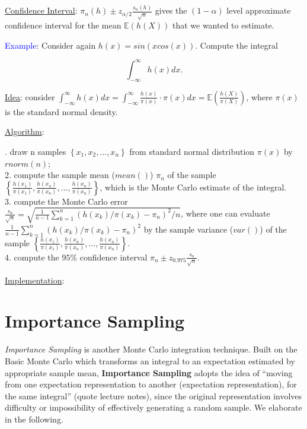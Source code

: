 \documentclass[12pt]{article}
\newcommand{\E}{\mathbb{E}}
\newcommand{\set}[1]{\left\{#1\right\}}
\newcommand{\paren}[1]{\left(#1\right)}
\numberwithin{equation}{subsection}
\begin{document}
\noindent
\underline{Confidence Interval}: $\pi_n(h) \pm z_{\alpha/2}\frac{s_n(h)}{\sqrt{n}}$ gives the $(1-\alpha)$ level approximate confidence interval for the mean $\E\paren{h(X)}$ that we wanted to estimate. \newline

\noindent
\textcolor{blue}{Example}: Consider again $h(x) = sin(xcos(x))$. Compute the integral 

$$ \int_{-\infty}^\infty h(x)dx. $$

\noindent
\underline{Idea}:
consider $\int_{-\infty}^\infty h(x)dx = \int_{-\infty}^\infty \frac{h(x)}{\pi(x)}\cdot\pi(x)dx = \E\paren{\frac{h(X)}{\pi(X)}}$, where $\pi(x)$ is the standard normal density. \newline

\noindent
\underline{Algorithm}: 

. draw n samples $\set{x_1, x_2, \dots, x_n}$ from standard normal distribution $\pi(x)$ by $rnorm(n)$;\\
2. compute the sample mean ($mean()$) $\pi_n$ of the sample $\set{\frac{h(x_1)}{\pi(x_1)}, \frac{h(x_n)}{\pi(x_n)}, \dots, \frac{h(x_n)}{\pi(x_n)}}$, which is the Monte Carlo estimate of the integral.\\
3. compute the Monte Carlo error $\frac{s_n}{\sqrt{n}} = \sqrt{\frac{1}{n-1}\sum\limits_{k=1}^n\paren{h(x_k)/\pi(x_k)-\pi_n}^2 / n}$, where one can evaluate $\frac{1}{n-1}\sum\limits_{k=1}^n\paren{h(x_k)/\pi(x_k)-\pi_n}^2$ by the sample variance ($var()$) of the sample $\set{\frac{h(x_1)}{\pi(x_1)}, \frac{h(x_n)}{\pi(x_n)}, \dots, \frac{h(x_n)}{\pi(x_n)}}$.\\
4. compute the $95\%$ confidence interval $\pi_n \pm z_{0.975}\frac{s_n}{\sqrt{n}}$.
\newline

\noindent
\underline{Implementation}:

\newpage
\section{Importance Sampling}

\textit{Importance Sampling} is another Monte Carlo integration technique. Built on the Basic Monte Carlo which transforms an integral to an expectation estimated by appropriate sample mean, \textbf{Importance Sampling} adopts the idea of ``moving from one expectation representation to another (expectation representation), for the same integral'' (quote lecture notes), since the original representation involves difficulty or impossibility of effectively generating a random sample. We elaborate in the following. \newline
\end{document}
